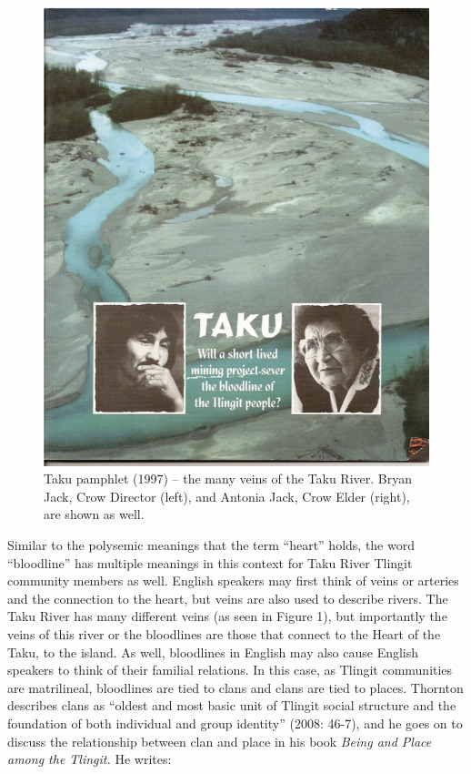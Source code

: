 \begin{figure}
    \centering
    \includegraphics{figures/schreyer-fig1}
    \caption[width=0.5\textwidth]{Taku pamphlet (1997) – the many veins of the Taku River. Bryan Jack, Crow Director (left), and Antonia Jack, Crow Elder (right), are shown as well.}
    \label{schreyer-fig1}
\end{figure}




Similar to the polysemic meanings that the term “heart” holds, the word “bloodline” has multiple meanings in this context for Taku River Tlingit community members as well. English speakers may first think of veins or arteries and the connection to the heart, but veins are also used to describe rivers. The Taku River has many different veins (as seen in Figure 1), but importantly the veins of this river or the bloodlines are those that connect to the Heart of the Taku, to the island. As well, bloodlines in English may also cause English speakers to think of their familial relations. In this case, as Tlingit communities are matrilineal, bloodlines are tied to clans and clans are tied to places. Thornton describes clans as “oldest and most basic unit of Tlingit social structure and the foundation of both individual and group identity” (2008: 46-7), and he goes on to discuss the relationship between clan and place in his book \textit{Being and Place among the Tlingit.} He writes:

